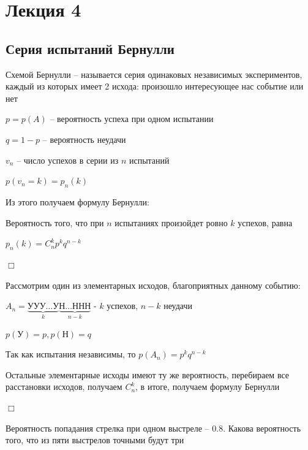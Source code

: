 \documentclass[12pt]{article}
\begin{document}
    \section{Лекция 4}

    \subsection{Серия испытаний Бернулли}

    \hypertarget{bernoullischema}{}

    Схемой Бернулли -- называется серия одинаковых независимых экспериментов, каждый из которых имеет 2 исхода: произошло интересующее нас событие или нет

    $p = p(A)$ -- вероятность успеха при одном испытании

    $q = 1 - p$ -- вероятность неудачи

    $v_n$ -- число успехов в серии из $n$ испытаний

    $p(v_n = k) = p_n(k)$

    \hypertarget{bernoulliformula}{}

    Из этого получаем формулу Бернулли:

    \begin{MyTheorem}
        \Ths Вероятность того, что при $n$ испытаниях произойдет ровно $k$ успехов, равна

        $p_n(k) = C_n^k p^k q^{n - k}$
    \end{MyTheorem}

    \begin{MyProof}
        $\Box$

        Рассмотрим один из элементарных исходов, благоприятных данному событию:

        $A_n = \underset{k}{\underbrace{\text{УУУ}\dots\text{У}}}\underset{n - k}{\underbrace{\text{Н}\dots\text{ННН}}}$ - $k$ успехов, $n - k$ неудачи

        $p(\text{У}) = p, p(\text{Н}) = q$

        Так как испытания независимы, то $p(A_n) = p^k q^{n - k}$

        Остальные элементарные исходы имеют ту же вероятность, перебираем все расстановки исходов, получаем $C_n^k$, в итоге, получаем формулу Бернулли

        $\Box$
    \end{MyProof}

    \Ex Вероятность попадания стрелка при одном выстреле -- $0.8$. Какова вероятность того, что из пяти выстрелов точными будут три
\end{document}
